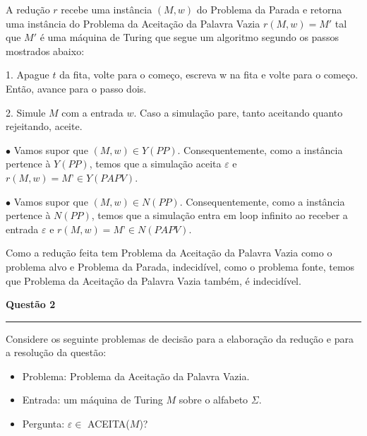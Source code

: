 \documentclass{article}
\begin{document}
\medskip

A redução $r$ recebe uma instância $(M, w)$ do Problema da Parada e retorna uma instância do Problema da Aceitação da Palavra Vazia $r(M, w) = M'$ tal que $M'$ é uma máquina de Turing que segue um algoritmo segundo os passos mostrados abaixo:

\smallskip

1. Apague $t$ da fita, volte para o começo, escreva w na fita e volte para o começo. Então, avance para o passo dois.

\smallskip

2. Simule $M$ com a entrada $w$. Caso a simulação pare, tanto aceitando quanto rejeitando, aceite.

\medskip

$\bullet$ Vamos supor que $(M, w) \in Y(PP)$. Consequentemente, como a instância pertence à $Y(PP)$, temos que a simulação aceita $\varepsilon$ e $r(M, w) = M’ \in Y(PAPV)$.

\smallskip

$\bullet$ Vamos supor que $(M, w) \in N(PP)$. Consequentemente, como a instância pertence à $N(PP)$, temos que a simulação entra em loop infinito ao receber a entrada $\varepsilon$ e $r(M, w) = M’ \in N(PAPV)$.

\medskip

Como a redução feita tem Problema da Aceitação da Palavra Vazia como o problema alvo e Problema da Parada, indecidível, como o problema fonte, temos que Problema da Aceitação da Palavra Vazia também, é indecidível.

\pagebreak

\begin{center}

    \vspace*{-11mm}
    \textbf{\large{Questão 2}}
    \vspace*{-4.8mm}

\end{center}

\noindent\rule{\textwidth}{0.5pt}

\bigskip

Considere os seguinte problemas de decisão para a elaboração da redução e para a resolução da questão:

\medskip

\begin{itemize}

    \item Problema: Problema da Aceitação da Palavra Vazia.
    \item Entrada: um máquina de Turing $M$ sobre o alfabeto $\Sigma$.
    \item Pergunta: $\varepsilon \in$ ACEITA($M$)?
    
\end{itemize}
\end{document}
